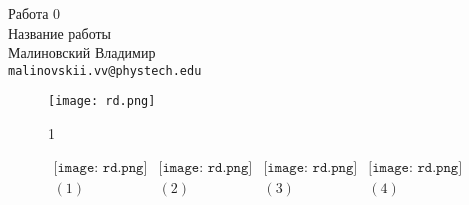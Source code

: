 



\begin{center}
  \LARGE{Работа 0}\\[0.2cm]
  \LARGE{Название работы}\\[0.2cm]
  \large{Малиновский Владимир}\\[0.2cm]
  \normalsize{\texttt{malinovskii.vv@phystech.edu}}
\end{center}











\lipsum[1-4]
\begin{wrapfigure}{R}{5cm}
\centering
\texttt{[image: rd.png]}
\caption{1}
\end{wrapfigure}
\lipsum[1-6]


\begin{figure}[h]
\begin{center}$
\begin{array}{cccc}
\texttt{[image: rd.png]}&
\texttt{[image: rd.png]}&
\texttt{[image: rd.png]}&
\texttt{[image: rd.png]}\\
(1) & (2) & (3) & (4)
\end{array}$
\end{center}
\end{figure}
